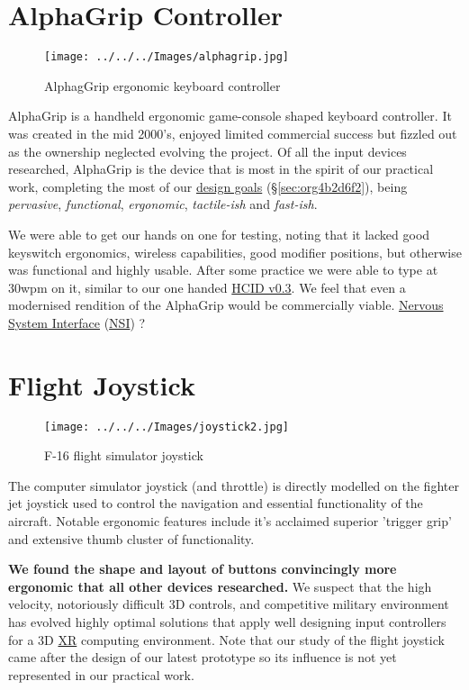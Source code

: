 \documentclass[logo,bsc,singlespacing,parskip]{infthesis}
\begin{document}
\section{AlphaGrip Controller}
\label{sec:orgcd1167d}
\begin{figure}[h]
\centering
\texttt{[image: ../../../Images/alphagrip.jpg]}
\caption{AlphagGrip ergonomic keyboard controller}
\end{figure}

AlphaGrip is a handheld ergonomic game-console shaped keyboard controller.
It was created in the mid 2000's, enjoyed limited commercial success but fizzled out as the ownership neglected evolving the project.
Of all the input devices researched, AlphaGrip is the device that is most in the spirit of our practical work, completing the most of our \hyperref[sec:org4b2d6f2]{design goals} (\S \ref{sec:org4b2d6f2}), being \emph{pervasive}, \emph{functional}, \emph{ergonomic}, \emph{tactile-ish} and \emph{fast-ish}.

We were able to get our hands on one for testing, noting that it lacked good keyswitch ergonomics, wireless capabilities, good modifier positions, but otherwise was functional and highly usable.
After some practice we were able to type at 30wpm on it, similar to our one handed \hyperref[sec:org0aa7648]{HCID v0.3}.
We feel that even a modernised rendition of the AlphaGrip would be commercially viable.
\hyperref[org25c8a28]{Nervous System Interface} (\hyperref[orgbcfe20a]{NSI}) ?
\section{Flight Joystick}
\label{sec:org6af5dd5}
\begin{figure}[h]
\centering
\texttt{[image: ../../../Images/joystick2.jpg]}
\caption{F-16 flight simulator joystick}
\end{figure}

The computer simulator joystick (and throttle) is directly modelled on the fighter jet joystick used to control the navigation and essential functionality of the aircraft.
Notable ergonomic features include it's acclaimed superior 'trigger grip' and extensive thumb cluster of functionality.

\textbf{We found the shape and  layout of buttons convincingly more ergonomic that all other devices researched.}
We suspect that the high velocity, notoriously difficult 3D controls, and competitive military environment has evolved highly optimal solutions that apply well designing input controllers for a 3D \hyperref[org53dbe83]{XR} computing environment.
Note that our study of the flight joystick came after the design of our latest prototype so its influence is not yet represented in our practical work.
\end{document}
